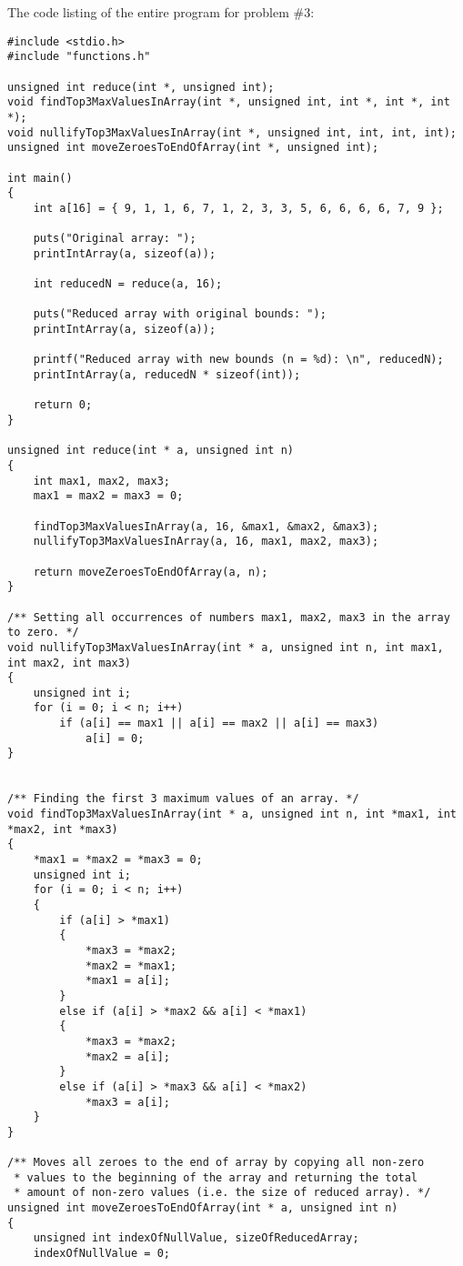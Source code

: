\documentclass{article}
\begin{document}
	
		\noindent The code listing of the entire program for problem \#3:
		\begin{verbatim}
#include <stdio.h>
#include "functions.h"

unsigned int reduce(int *, unsigned int);
void findTop3MaxValuesInArray(int *, unsigned int, int *, int *, int *);
void nullifyTop3MaxValuesInArray(int *, unsigned int, int, int, int);
unsigned int moveZeroesToEndOfArray(int *, unsigned int);

int main()
{
    int a[16] = { 9, 1, 1, 6, 7, 1, 2, 3, 3, 5, 6, 6, 6, 6, 7, 9 };

    puts("Original array: ");
    printIntArray(a, sizeof(a));

    int reducedN = reduce(a, 16);

    puts("Reduced array with original bounds: ");
    printIntArray(a, sizeof(a));

    printf("Reduced array with new bounds (n = %d): \n", reducedN);
    printIntArray(a, reducedN * sizeof(int));

    return 0;
}

unsigned int reduce(int * a, unsigned int n)
{
    int max1, max2, max3;
    max1 = max2 = max3 = 0;

    findTop3MaxValuesInArray(a, 16, &max1, &max2, &max3);
    nullifyTop3MaxValuesInArray(a, 16, max1, max2, max3);

    return moveZeroesToEndOfArray(a, n);
}

/** Setting all occurrences of numbers max1, max2, max3 in the array to zero. */
void nullifyTop3MaxValuesInArray(int * a, unsigned int n, int max1, int max2, int max3)
{
    unsigned int i;
    for (i = 0; i < n; i++)
        if (a[i] == max1 || a[i] == max2 || a[i] == max3)
            a[i] = 0;
}


/** Finding the first 3 maximum values of an array. */
void findTop3MaxValuesInArray(int * a, unsigned int n, int *max1, int *max2, int *max3)
{
    *max1 = *max2 = *max3 = 0;
    unsigned int i;
    for (i = 0; i < n; i++)
    {
        if (a[i] > *max1)
        {
            *max3 = *max2;
            *max2 = *max1;
            *max1 = a[i];
        }
        else if (a[i] > *max2 && a[i] < *max1)
        {
            *max3 = *max2;
            *max2 = a[i];
        }
        else if (a[i] > *max3 && a[i] < *max2)
            *max3 = a[i];
    }
}

/** Moves all zeroes to the end of array by copying all non-zero
 * values to the beginning of the array and returning the total
 * amount of non-zero values (i.e. the size of reduced array). */
unsigned int moveZeroesToEndOfArray(int * a, unsigned int n)
{
    unsigned int indexOfNullValue, sizeOfReducedArray;
    indexOfNullValue = 0;


\end{verbatim}
\end{document}
